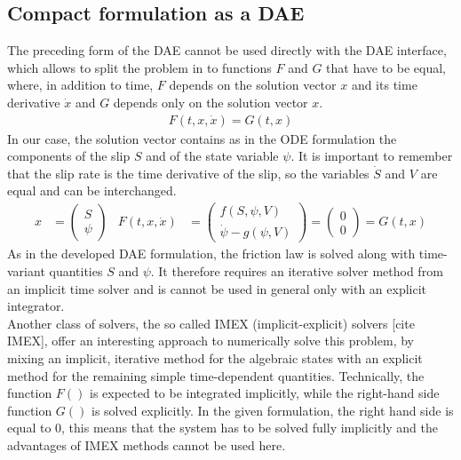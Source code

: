 \documentclass{report}
\begin{document}
\subsection{Compact formulation as a DAE}
The preceding form of the DAE cannot be used directly with the DAE interface, which allows to split the problem in to functions $F$ and $G$ that have to be equal, where, in addition to time, $F$ depends on the solution vector $x$ and its time derivative $\dot{x}$ and $G$ depends only on the solution vector $x$. 
\begin{align}
	F(t, x,\dot{x}) = G(t,x) 
\end{align}
In our case, the solution vector contains as in the ODE formulation the components of the slip $S$ and of the state variable $\psi$. It is important to remember that the slip rate is the time derivative of the slip, so the variables $\dot{S}$ and $V$ are equal and can be interchanged.
\begin{align}
	\label{eq:DAE_compact_formulation_SEAS}
	x &= \begin{pmatrix}
			S \\ \psi
	     \end{pmatrix} & F(t, x,\dot{x}) &= \begin{pmatrix}
												f(S,\psi,V) \\ \dot{\psi} - g(\psi, V)
											\end{pmatrix} = \begin{pmatrix}
																0 \\ 0
															\end{pmatrix} = G(t,x)
\end{align}
As in the developed DAE formulation, the friction law is solved along with time-variant quantities $S$ and $\psi$. It therefore requires an iterative solver method from an implicit time solver and is cannot be used in general only with an explicit integrator. \\
Another class of solvers, the so called IMEX (implicit-explicit) solvers [cite IMEX], offer an interesting approach to numerically solve this problem, by mixing an implicit, iterative method for the algebraic states with an explicit method for the remaining simple time-dependent quantities. Technically, the function $F()$ is expected to be integrated implicitly, while the right-hand side function $G()$ is solved explicitly. In the given formulation, the right hand side is equal to 0, this means that the system has to be solved fully implicitly and the advantages of IMEX methods cannot be used here. 
\end{document}
